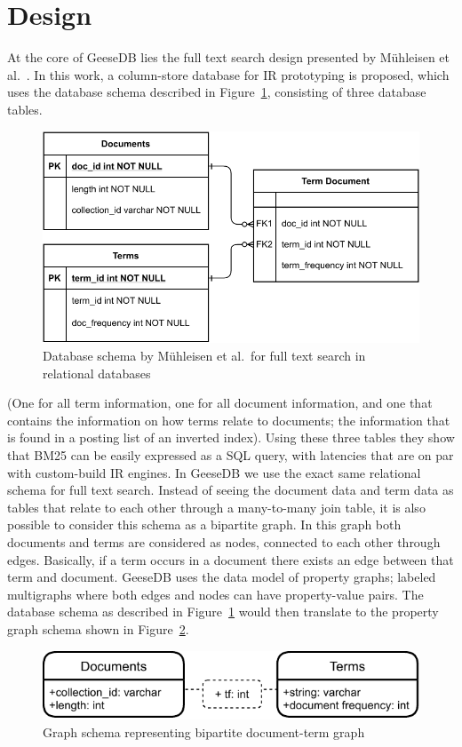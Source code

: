 \section{Design}
At the core of GeeseDB lies the full text search design presented by M\"{u}hleisen et al.~\cite{OldDog}. In this work, a column-store database for IR prototyping is proposed, which uses the database schema described in Figure~\ref{olddog_schema}, consisting of three database tables.
\begin{figure}[!h]
	\centering
	\includegraphics[width=\linewidth]{./imgs/olddog-schema-2.pdf}
	\caption{Database schema by M\"{u}hleisen et al.~for full text search in relational databases}
	\label{olddog_schema}
\end{figure}
(One for all term information, one for all document information, and one that contains the information on how terms relate to documents; the information that is found in a posting list of an inverted index). Using these three tables they show that BM25 can be easily expressed as a SQL query, with latencies that are on par with custom-build IR engines. In GeeseDB we use the exact same relational schema for full text search.
Instead of seeing the document data and term data as tables that relate to each other through a many-to-many join table, it is also possible to consider this schema as a bipartite graph. In this graph both documents and terms are considered as nodes, connected to each other through edges. Basically, if a term occurs in a document there exists an edge between that term and document. GeeseDB uses the data model of property graphs; labeled multigraphs where both edges and nodes can have property-value pairs. The database schema as described in Figure~\ref{olddog_schema} would then translate to the property graph schema shown in Figure~\ref{olddog-graph-schema}.
\begin{figure}[!h]
	\centering
	\includegraphics[width=\linewidth]{./imgs/olddog-graph-schema.pdf}
	\caption{Graph schema representing bipartite document-term graph}
	\label{olddog-graph-schema}
\end{figure}
